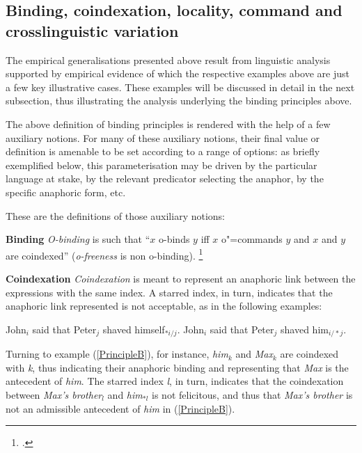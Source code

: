 \documentclass[output=paper
	        ,collection
	        ,collectionchapter
 	        ,biblatex
                ,babelshorthands
                ,newtxmath
                ,draftmode
                ,colorlinks, citecolor=brown
]{langscibook}
\begin{document}
\subsection{Binding, coindexation, locality, command and crosslinguistic variation}\label{parameterisation}


The empirical generalisations presented above result from linguistic analysis supported by empirical
evidence of which the respective examples above are just a few key illustrative cases. These examples will be discussed
in detail in the next subsection, thus illustrating the analysis underlying the binding principles above.

The above definition of binding principles is rendered with the help of a few auxiliary
notions. For many of these auxiliary notions, their final value or definition is amenable to be
set according to a range of options: as briefly exemplified below, this parameterisation may be
driven by the particular language at stake, by the relevant predicator
selecting the anaphor, by the specific anaphoric form, etc.

These are the definitions of those auxiliary notions:

{\bf Binding} {\em O-binding} is such that ``$x$ o-binds $y$ iff $x$ o"=commands $y$ 
and $x$ and $y$ are coindexed'' ({\em o-freeness} is non o-binding).%
\footnote{\citep[]{polsag:hpsg94}.}

{\bf Coindexation} {\em Coindexation} is meant to represent an anaphoric link between the expressions 
with the same index. A starred index, in turn, indicates that the anaphoric link represented is not acceptable, as in the following examples:

\begin{exe}
\ex
\begin{xlist}
\ex John$_{i}$ said that Peter$_{j}$ shaved himself$_{*i/j}$.
\ex John$_{i}$ said that Peter$_{j}$ shaved him$_{i/*j}$.
\end{xlist}
\end{exe}

Turning to example (\ref{PrincipleB}), for instance, {\em him}$_{k}$ and {\em Max}$_{k}$ are
coindexed with {\em k}, thus indicating their anaphoric binding and representing that {\em Max} is the antecedent
of {\em him}. The starred index {\em *l}, in turn, indicates that the coindexation between  {\em Max's brother}$_{l}$
and {\em him}$_{*l}$ is not felicitous, and thus that {\em Max's brother} is not an admissible 
antecedent of {\em him} in (\ref{PrincipleB}).
\end{document}
